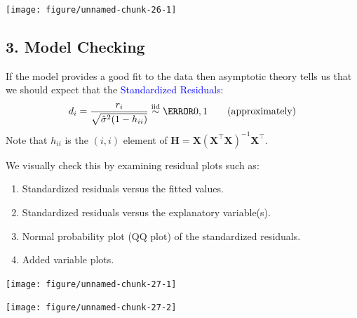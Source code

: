 \documentclass[oneside]{book}\usepackage[]{graphicx}\usepackage[svgnames]{xcolor}
\newenvironment{knitrout}{}{} %
\newcommand{\iid}{\overset{\text{iid}}{\sim}}%
\providecommand{\Matrix}[1]{\bm{#1}}
\begin{document}
\begin{knitrout}
\color{fgcolor}

{\centering \texttt{[image: figure/unnamed-chunk-26-1]} 

}


\end{knitrout}

\subsection*{3. Model Checking}
If the model provides a good fit to the data then asymptotic theory tells us that we
should expect that the \textcolor{Blue}{Standardized Residuals}:
\[ d_i=\frac{r_i}{\sqrt{\hat{\sigma}^2(1-h_{ii})}} \iid\N{0,1}\qquad\text{(approximately)}  \]
Note that $ h_{ii} $ is the $ (i,i) $ element of $ \Matrix{H}= \Matrix{X}(\Matrix{X}^\top \Matrix{X})^{-1} \Matrix{X}^\top $.

We visually check this by examining residual plots such as:
\begin{enumerate}[1.]
      \item Standardized residuals versus the fitted values.
      \item Standardized residuals versus the explanatory variable(s).
      \item Normal probability plot (QQ plot) of the standardized residuals.
      \item Added variable plots.
\end{enumerate}
\begin{knitrout}
\color{fgcolor}

{\centering \texttt{[image: figure/unnamed-chunk-27-1]} 

}




{\centering \texttt{[image: figure/unnamed-chunk-27-2]} 

}


\end{knitrout}
\end{document}
